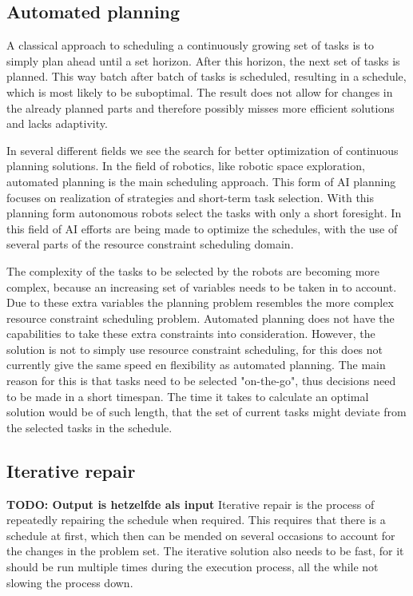 \documentclass{article}
\newcommand{\TODO}[1]{{\color{red}\textbf{TODO: #1}}}
\begin{document}
\subsection{Automated planning}

A classical approach to scheduling a continuously growing set of tasks is to simply plan ahead until a set horizon.
After this horizon, the next set of tasks is planned.
This way batch after batch of tasks is scheduled, resulting in a schedule, which is most likely to be suboptimal.
The result does not allow for changes in the already planned parts and therefore possibly misses more efficient solutions and lacks adaptivity.
\cite{chien00}

In several different fields we see the search for better optimization of continuous planning solutions.
In the field of robotics, like robotic space exploration, automated planning is the main scheduling approach.
This form of AI planning focuses on realization of strategies and short-term task selection.
With this planning form autonomous robots select the tasks with only a short foresight.
In this field of AI efforts are being made to optimize the schedules, with the use of several parts of the resource constraint scheduling domain.
\cite{smith00}

The complexity of the tasks to be selected by the robots are becoming more complex, because an increasing set of variables needs to be taken in to account.
Due to these extra variables the planning problem resembles the more complex resource constraint scheduling problem.
Automated planning does not have the capabilities to take these extra constraints into consideration.
However, the solution is not to simply use resource constraint scheduling, for this does not currently give the same speed en flexibility as automated planning.
The main reason for this is that tasks need to be selected "on-the-go", thus decisions need to be made in a short timespan.
The time it takes to calculate an optimal solution would be of such length, that the set of current tasks might deviate from the selected tasks in the schedule.

\subsection{Iterative repair}
\TODO{Output is hetzelfde als input}
Iterative repair is the process of repeatedly repairing the schedule when required.
This requires that there is a schedule at first, which then can be mended on several occasions to account for the changes in the problem set.
The iterative solution also needs to be fast, for it should be run multiple times during the execution process, all the while not slowing the process down.
\end{document}
